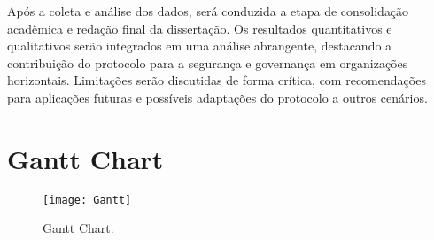 Após a coleta e análise dos dados, será conduzida a etapa de consolidação
acadêmica e redação final da dissertação. Os resultados quantitativos e
qualitativos serão integrados em uma análise abrangente, destacando a
contribuição do protocolo para a segurança e governança em organizações
horizontais. Limitações serão discutidas de forma crítica, com recomendações
para aplicações futuras e possíveis adaptações do protocolo a outros cenários.

\section{Gantt Chart}
\label{sec:gantt_chart}


\begin{figure}[htbp]
  \centering
  \texttt{[image: Gantt]}
  \caption{Gantt Chart.}
  \label{fig:Gannt}
\end{figure}